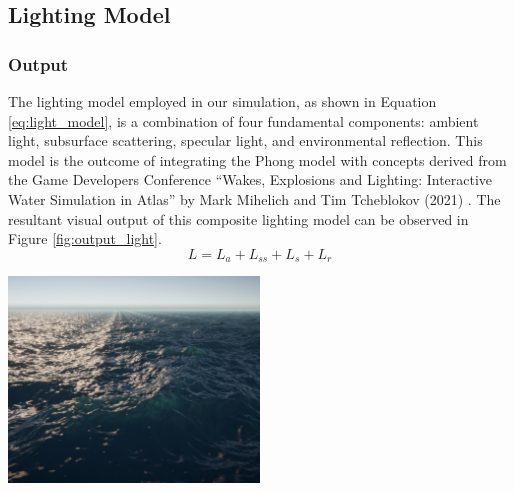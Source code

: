 \subsection{Lighting Model}

\subsubsection{Output}

The lighting model employed in our simulation, as shown in Equation \ref{eq:light_model}, is a combination of four fundamental components: ambient light, subsurface scattering, specular light, and environmental reflection. This model is the outcome of integrating the Phong model with concepts derived from the Game Developers Conference “Wakes, Explosions and Lighting: Interactive Water Simulation in Atlas” by Mark Mihelich and Tim Tcheblokov (2021) \cite{mark2021}. The resultant visual output of this composite lighting model can be observed in Figure \ref{fig:output_light}.
\begin{equation}
    L = L_a + L_{ss} + L_s + L_r
    \label{eq:light_model}
\end{equation}
\begin{minipage}{1\textwidth}
    \centering
    \includegraphics[width=0.50\textwidth]{"images/output_light.png"}
    \label{fig:output_light}
\end{minipage}

